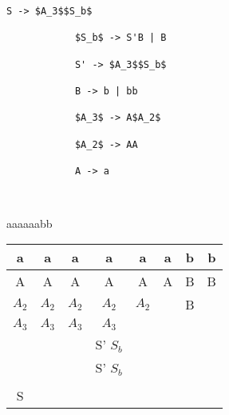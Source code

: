 \documentclass[12pt]{article}
\begin{document}
\begin{enumerate}
\begin{lstlisting}[language=Lambda]
            S -> $A_3$$S_b$

            $S_b$ -> S'B | B

            S' -> $A_3$$S_b$ 

            B -> b | bb

            $A_3$ -> A$A_2$

            $A_2$ -> AA

            A -> a

            
            \end{lstlisting}


            aaaaaabb

             \begin{tabular}{ |c|c|c|c|c|c|c|c| } 
             \hline
             a & a & a & a & a & a & b & b\\ 
             \hline
             \hline
             A & A & A & A & A & A & B & B \\
             \hline
             $A_2$ & $A_2$ & $A_2$ & $A_2$ & $A_2$ &  & B &  \\
             \hline
             $A_3$ & $A_3$ & $A_3$ & $A_3$ &  &  &  &  \\
             \hline
              & &  & S' $S_b$ & & &  &  \\
             \hline
              &  &  & S' $S_b$ &  &  &  &  \\
             \hline
              &  &  &  & &  &  &  \\
             \hline
              S &  &  &  &  &  & &  \\
             \hline
            \end{tabular}           


	\end{enumerate}
\end{document}
